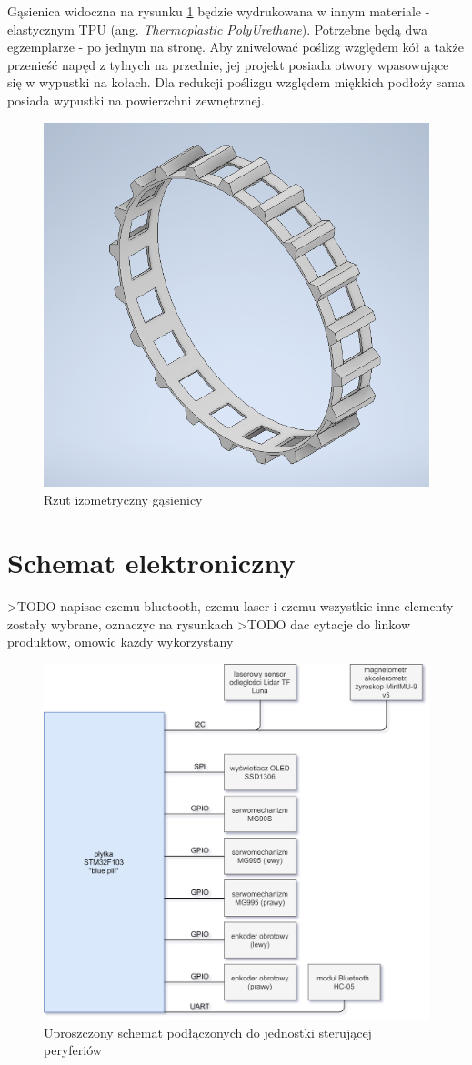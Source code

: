 Gąsienica widoczna na rysunku \ref{fig:tracks} będzie wydrukowana w innym materiale - elastycznym TPU (ang. \emph{Thermoplastic PolyUrethane}). Potrzebne będą dwa egzemplarze - po jednym na stronę. Aby zniwelować poślizg względem kół a także przenieść napęd z tylnych na przednie, jej projekt posiada otwory wpasowujące się w wypustki na kołach. Dla redukcji poślizgu względem miękkich podłoży sama posiada wypustki na powierzchni zewnętrznej.

\begin{figure}[H]
	\centering
		\includegraphics[width=0.6\linewidth]{rys/tracks-final.png}
	\caption{Rzut izometryczny gąsienicy}
	\label{fig:tracks}
\end{figure}



\section{Schemat elektroniczny}
>TODO napisac czemu bluetooth, czemu laser i czemu wszystkie inne elementy zostały wybrane, oznaczyc na rysunkach
>TODO dac cytacje do linkow produktow, omowic kazdy wykorzystany

\begin{figure}[ht]
	\centering
		\includegraphics[width=1\linewidth]{rys/electronic-schematic.png}
	\caption{Uproszczony schemat podłączonych do jednostki sterującej peryferiów}
	\label{fig:electronic-schematic-simplified}
\end{figure}


